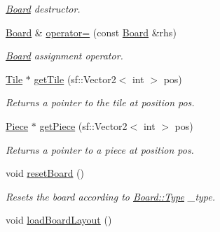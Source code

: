 \begin{DoxyCompactItemize}
\begin{DoxyCompactList}\small\item\em \hyperlink{class_board}{Board} destructor. \end{DoxyCompactList}\item 
\hyperlink{class_board}{Board} \& \hyperlink{class_board_a57a4317cebaae4f6879856262cf9caae}{operator=} (const \hyperlink{class_board}{Board} \&rhs)
\begin{DoxyCompactList}\small\item\em \hyperlink{class_board}{Board} assignment operator. \end{DoxyCompactList}\item 
\hyperlink{class_tile}{Tile} $\ast$ \hyperlink{class_board_afced07c80ca74d286dd9b175a2d5f6a9}{get\-Tile} (sf\-::\-Vector2$<$ int $>$ pos)
\begin{DoxyCompactList}\small\item\em Returns a pointer to the tile at position pos. \end{DoxyCompactList}\item 
\hyperlink{class_piece}{Piece} $\ast$ \hyperlink{class_board_a8761adddad6de7ac38389784e22b3a43}{get\-Piece} (sf\-::\-Vector2$<$ int $>$ pos)
\begin{DoxyCompactList}\small\item\em Returns a pointer to a piece at position pos. \end{DoxyCompactList}\item 
\hypertarget{class_board_a7cef7a9ca499d64c71cb170d67f76ad0}{void \hyperlink{class_board_a7cef7a9ca499d64c71cb170d67f76ad0}{reset\-Board} ()}\label{class_board_a7cef7a9ca499d64c71cb170d67f76ad0}

\begin{DoxyCompactList}\small\item\em Resets the board according to \hyperlink{class_board_a7a90fdd0f301fc502684108416605644}{Board\-::\-Type} \-\_\-type. \end{DoxyCompactList}\item 
\hypertarget{class_board_afffa04d521831cad05e566c8d7670d40}{void \hyperlink{class_board_afffa04d521831cad05e566c8d7670d40}{load\-Board\-Layout} ()}\label{class_board_afffa04d521831cad05e566c8d7670d40}


\end{DoxyCompactItemize}
